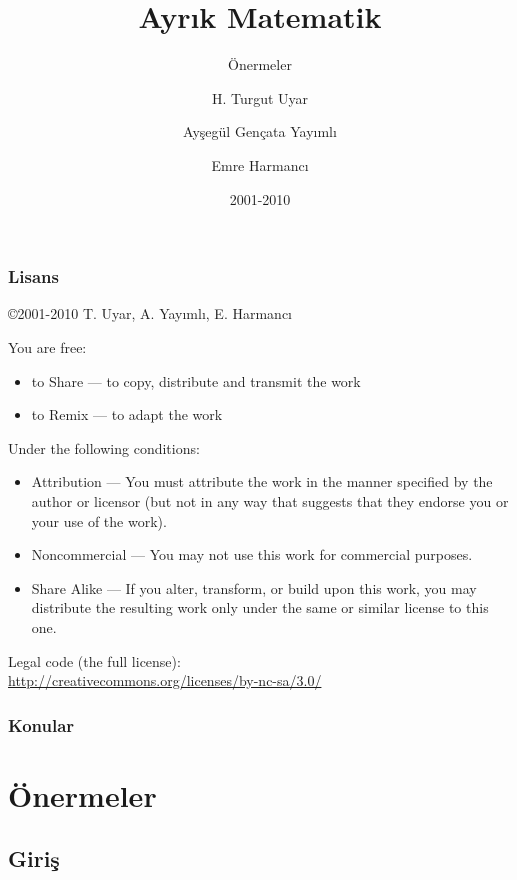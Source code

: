 \documentclass[dvipsnames]{beamer}
\title{Ayrık Matematik}
\subtitle{Önermeler}
\author{H. Turgut Uyar \and Ayşegül Gençata Yayımlı \and Emre Harmancı}
\date{2001-2010}
\theoremstyle{definition}
\theoremstyle{example}
\theoremstyle{plain}
\begin{document}
\begin{frame}
  \titlepage
\end{frame}

\begin{frame}
  \frametitle{Lisans}

  \hfill
  \copyright 2001-2010 T. Uyar, A. Yayımlı, E. Harmancı

  \vfill
  \begin{tiny}
    You are free:
    \begin{itemize}
      \item to Share — to copy, distribute and transmit the work
      \item to Remix — to adapt the work
    \end{itemize}

    Under the following conditions:
    \begin{itemize}
      \item Attribution — You must attribute the work in the manner specified by
        the author or licensor (but not in any way that suggests that they
        endorse you or your use of the work).

      \item Noncommercial — You may not use this work for commercial purposes.

      \item Share Alike — If you alter, transform, or build upon this work, you
        may distribute the resulting work only under the same or similar license
        to this one.
    \end{itemize}
  \end{tiny}

  \vfill
  Legal code (the full license):\\
  \url{http://creativecommons.org/licenses/by-nc-sa/3.0/}
\end{frame}

\begin{frame}
  \frametitle{Konular}
  \tableofcontents
\end{frame}

\section{Önermeler}

\subsection{Giriş}
\end{document}
